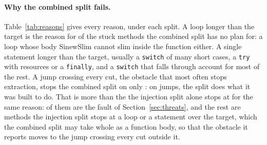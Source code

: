 \documentclass[11pt,a4paper]{article}
\newcommand{\fitwidth}[1]{\resizebox{\ifdim\width>\textwidth\textwidth\else\width\fi}{!}{#1}}
\newcommand{\sig}[1]{\texttt{#1}}
\newcommand{\Hone}{H1}
\begin{document}
\begin{table}[t]
\centering\small
\caption{The stuck methods by category, tested conventional first, under the injection split and under the combined split. Category 3 under the combined split is \Hone{}'s count.}
\label{tab:categories}

\end{table}

\paragraph{Why the combined split fails.} Table~\ref{tab:reasons} gives
every reason, under each split. A loop longer than the target is the reason
for \loopShareStuckNoPlanC{} of the \nStuckNoPlanC{} stuck methods the
combined split has no plan for: a loop whose body SinewSlim cannot slim
inside the function either. A single statement longer than the target,
usually a \sig{switch} of many short cases, a \sig{try} with resources or a
\sig{finally}, and a \sig{switch} that falls through account for most of the
rest. A jump crossing every cut, the obstacle that most often stops
extraction, stops the combined split on only \jumpsStuckNoPlanC{}: on jumps,
the split does what it was built to do. That is more than the
\jumpsStuckNoPlan{} the injection split alone stops at for the same reason:
\nCatThreeLost{} of them are the fault of Section~\ref{sec:threats}, and
the rest are methods the injection split stops at a loop or a statement over
the target, which the combined split may take whole as a function body, so
that the obstacle it reports moves to the jump crossing every cut outside
it.

\begin{table}[t]
\centering\small
\caption{Why the split has no plan: each reason's count among the stuck methods and among all long methods, under the injection split and under the combined split.}
\label{tab:reasons}
\fitwidth{}
\end{table}
\end{document}
